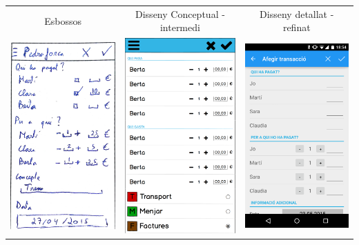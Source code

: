 \begin{table}
\begin{tabular}{| c | c | c |}
\hline
Esbossos & Disseny Conceptual - intermedi & Disseny detallat - refinat \\
\includegraphics[width=50mm]{1_Add_group_transaction.jpg} &
\includegraphics[width=50mm]{2_Add_group_transaction.png} &
\includegraphics[width=50mm]{3_Add_group_transaction.png}  \\

\end{tabular}
\end{table}
